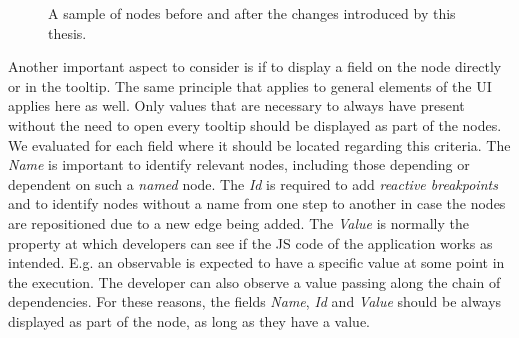\begin{figure}[!h]
	\centering
	\hfill
	\caption{A sample of nodes before and after the changes introduced by this thesis.}
	\label{fig:Nodes}
\end{figure}
Another important aspect to consider is if to display a field on the node directly or in the tooltip. The same principle that applies to general elements of the UI applies here as well. Only values that are necessary to always have present without the need to open every tooltip should be displayed as part of the nodes. We evaluated for each field where it should be located regarding this criteria. The \emph{Name} is important to identify relevant nodes, including those depending or dependent on such a \emph{named} node. The \emph{Id} is required to add \emph{reactive breakpoints} and to identify nodes without a name from one step to another in case the nodes are repositioned due to a new edge being added. The \emph{Value} is normally the property at which developers can see if the JS code of the application works as intended. E.g. an observable is expected to have a specific value at some point in the execution. The developer can also observe a value passing along the chain of dependencies. For these reasons, the fields \emph{Name}, \emph{Id} and \emph{Value} should be always displayed as part of the node, as long as they have a value.
